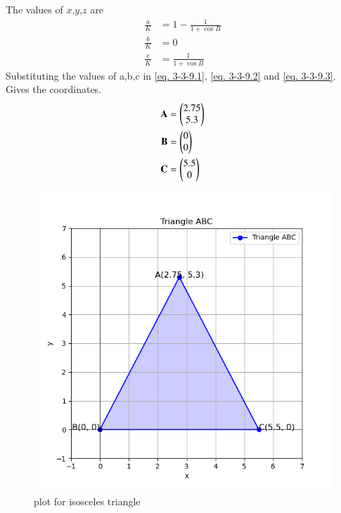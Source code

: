 \documentclass[journal]{IEEEtran}
\begin{document}
The values of $x$,$y$,$z$ are
\begin{align}
\frac{a}{K} &= 1 - \frac{1}{1+\cos B}\label{eq. 3-3-9.4}\\
\frac{b}{K} &= 0\label{eq. 3-3-9.5}\\
	\frac{c}{K} &= \frac{1}{1 + \cos B}\label{eq. 3-3-9.6}
\end{align}
Substituting  the values of a,b,c in \ref{eq. 3-3-9.1}, \ref{eq. 3-3-9.2} and \ref{eq. 3-3-9.3}. Gives the coordinates. 
\begin{align*}
     \textbf{A}&=\begin{pmatrix}2.75\\5.3\end{pmatrix}\\
     \textbf{B}&=\begin{pmatrix}0\\0\end{pmatrix}\\
     \textbf{C}&=\begin{pmatrix}5.5\\0\end{pmatrix}
\end{align*}


\begin{figure}[h!]
\centering
\includegraphics[width=0.7\columnwidth]{figs/Figure_1.png}
\caption{plot for isosceles triangle}
 \label{fig. 3-3-9-1}
\end{figure}
\end{document}
